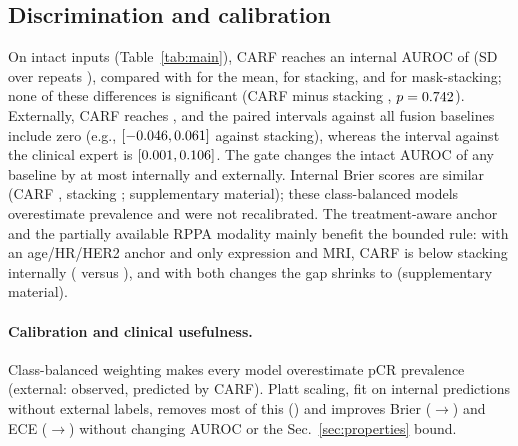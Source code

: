\documentclass[a4paper,runningheads]{llncs}
\begin{document}
\subsection{Discrimination and calibration}

\begin{table}[t]
\centering
\caption{Discrimination on intact inputs and under modality failure. Internal: mean over 25 folds. Fail.\ avg: mean AUROC over missing and swapped RNA, MRI, and RPPA (internal) or RNA and MRI (external). Worst: minimum over intact inputs and failures; 95\% CI for CARF (paired comparisons in supplement). $\max|z-a|$: largest logit change from the anchor across external scenarios.}\label{tab:main}
\setlength{\tabcolsep}{3pt}
\end{table}

On intact inputs (Table~\ref{tab:main}), CARF reaches an internal AUROC of \IntCarfTwo{} (SD over repeats \IntCarfTwoSd{}), compared with \IntMean{} for the mean, \IntStack{} for stacking, and \IntMaskStack{} for mask-stacking; none of these differences is significant (CARF minus stacking \DIntIntactStack{}, $p=0.742$). Externally, CARF reaches \ExtCarfTwo{}, and the paired intervals against all fusion baselines include zero (e.g., $[-0.046,0.061]$ against stacking), whereas the interval against the clinical expert is $[0.001,0.106]$. The gate changes the intact AUROC of any baseline by at most \GateIntactDropInt{} internally and \GateIntactDropExt{} externally. Internal Brier scores are similar (CARF \IntBrierCarfTwo{}, stacking \IntBrierStack{}; supplementary material); these class-balanced models overestimate prevalence and were not recalibrated. The treatment-aware anchor and the partially available RPPA modality mainly benefit the bounded rule: with an age/HR/HER2 anchor and only expression and MRI, CARF is \DesGapVOne{} below stacking internally (\DesVOneCarfTwo{} versus \DesVOneStack{}), and with both changes the gap shrinks to \DesGapFinal{} (supplementary material).

\paragraph{Calibration and clinical usefulness.} Class-balanced weighting makes every model overestimate pCR prevalence (external: \CalibTruePrev{} observed, \CalibExtCarfPrevBefore{} predicted by CARF). Platt scaling, fit on internal predictions without external labels, removes most of this (\CalibExtCarfPrevAfter{}) and improves Brier (\CalibExtCarfBrierBefore{}$\to$\CalibExtCarfBrierAfter{}) and ECE (\CalibExtCarfEceBefore{}$\to$\CalibExtCarfEceAfter{}) without changing AUROC or the Sec.~\ref{sec:properties} bound.
\end{document}
